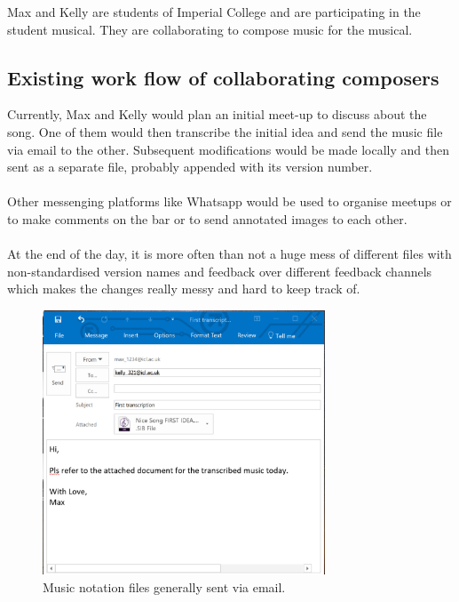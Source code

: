 \documentclass[a4paper]{article}
\begin{document}
Max and Kelly are students of Imperial College and are participating in the student musical. They are collaborating to compose music for the musical.


\subsection{Existing work flow of collaborating composers}
Currently, Max and Kelly would plan an initial meet-up to discuss about the song. One of them would then transcribe the initial idea and send the music file via email to the other. Subsequent modifications would be made locally and then sent as a separate file, probably appended with its version number. \\
\\ 
Other messenging platforms like Whatsapp would be used to organise meetups or to make comments on the bar or to send annotated images to each other. \\
\\
At the end of the day, it is more often than not a huge mess of different files with non-standardised version names and feedback over different feedback channels which makes the changes really messy and hard to keep track of.


\begin{figure}[th]
\centering
\includegraphics[width=0.75\textwidth]{Email.png}
\caption{\label{fig:email}Music notation files generally sent via email.}
\end{figure}
\end{document}
